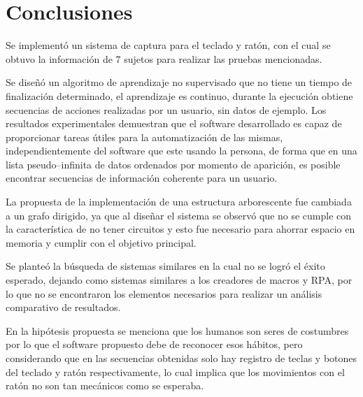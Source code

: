 \section{Conclusiones}

Se implement\'o un sistema de captura para el teclado y rat\'on, con el cual
 se obtuvo la informaci\'on de 7 sujetos para realizar las pruebas mencionadas.


Se dise\~n\'o un algoritmo de aprendizaje no supervisado que no tiene un
 tiempo de finalizaci\'on determinado, el aprendizaje es continuo, durante la 
 ejecuci\'on obtiene secuencias de acciones realizadas por un usuario, sin 
 datos de ejemplo. Los resultados experimentales demuestran que el software 
 desarrollado es capaz de proporcionar tareas \'utiles para la 
 automatizaci\'on de las mismas, independientemente del software que este 
 usando la persona, de forma que en una lista pseudo--infinita de datos 
 ordenados por momento de aparici\'on, es posible encontrar secuencias de 
 informaci\'on coherente para un usuario.

	
La propuesta de la implementaci\'on de una estructura arborescente fue
 cambiada a un grafo dirigido, ya que al dise\~nar el sistema se observ\'o que 
 no se cumple con la caracter\'istica de no tener circuitos y esto fue 
 necesario para ahorrar espacio en memoria y cumplir con el objetivo 
 principal.


Se plante\'o la b\'usqueda de sistemas similares en la cual no se logr\'o 
 el \'exito esperado, dejando como sistemas similares a los creadores de
 macros y RPA, por lo que no se encontraron los elementos necesarios 
 para realizar un an\'alisis comparativo de resultados.


En la hip\'otesis propuesta se menciona que los humanos son seres de 
 costumbres por lo que el software propuesto debe de reconocer esos h\'abitos, 
 pero considerando que en las secuencias obtenidas solo hay registro de teclas
 y botones del teclado y rat\'on respectivamente, lo cual implica que los
 movimientos con el rat\'on no son tan mec\'anicos como se esperaba.
 